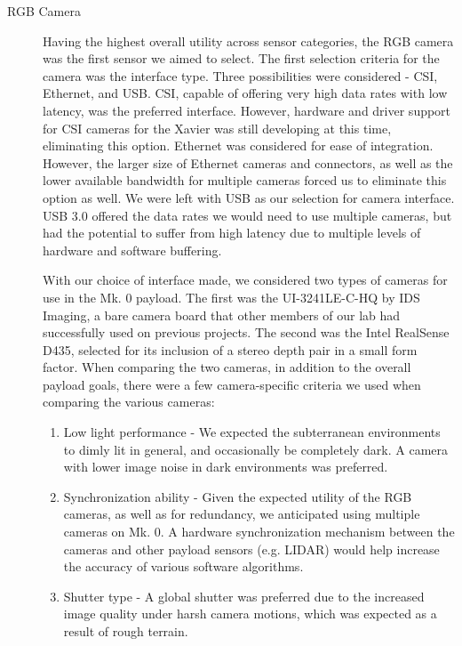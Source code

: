 \begin{description}
	\item[RGB Camera] Having the highest overall utility across sensor categories, the RGB camera was the first sensor we aimed to select. The first selection criteria for the camera was the interface type. Three possibilities were considered -  CSI, Ethernet, and USB. CSI, capable of offering very high data rates with low latency, was the preferred interface. However, hardware and driver support for CSI cameras for the Xavier was still developing at this time, eliminating this option. Ethernet was considered for ease of integration. However, the larger size of Ethernet cameras and connectors, as well as the lower available bandwidth for multiple cameras forced us to eliminate this option as well. We were left with USB as our selection for camera interface. USB 3.0 offered the data rates we would need to use multiple cameras, but had the potential to suffer from high latency due to multiple levels of hardware and software buffering.
	
	With our choice of interface made, we considered two types of cameras for use in the Mk. 0 payload. The first was the UI-3241LE-C-HQ by IDS Imaging, a bare camera board that other members of our lab had successfully used on previous projects. The second was the Intel RealSense D435, selected for its inclusion of a stereo depth pair in a small form factor. When comparing the two cameras, in addition to the overall payload goals, there were a few camera-specific criteria we used when comparing the various cameras:
	
	\begin{enumerate}
		\item Low light performance - We expected the subterranean environments to dimly lit in general, and occasionally be completely dark. A camera with lower image noise in dark environments was preferred.
		\item Synchronization ability - Given the expected utility of the RGB cameras, as well as for redundancy, we anticipated using multiple cameras on Mk. 0. A hardware synchronization mechanism between the cameras and other payload sensors (e.g. LIDAR) would help increase the accuracy of various software algorithms.
		\item Shutter type - A global shutter was preferred due to the increased image quality under harsh camera motions, which was expected as a result of rough terrain.
	\end{enumerate}
	

\end{description}
